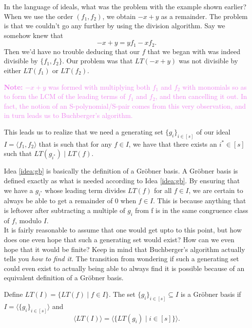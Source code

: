 \documentclass[10pt]{article}
\newcommand{\gb}{Gr\"{o}bner }
\newcommand*{\ideal}[1]{\langle#1\rangle}
\begin{document}
In the language of ideals, what was the problem with the example shown earlier? When we use the order $(f_1, f_2)$, we obtain $-x + y$ as a remainder. The problem is that we couldn't go any further by using the division algorithm. Say we somehow knew that
\[
-x + y = yf_1 - xf_2.
\]
Then we'd have no trouble deducing that our $f$ that we began with was indeed divisible by $\{f_1, f_2\}$. Our problem was that $LT(-x+y)$ was not divisible by either $LT(f_1)$ or $LT(f_2)$. 

\begin{mdframed}
\textcolor{Violet}{\textbf{Note:} $-x + y$ was formed with multiplying both $f_1$ and $f_2$ with monomials so as to form the LCM of the leading terms of $f_1$ and $f_2$, and then cancelling it out. In fact, the notion of an S-polynomial/S-pair comes from this very observation, and in turn leads us to Buchberger's algorithm.}
\end{mdframed}

\begin{ideabox}
\label{idea:gb}
This leads us to realize that we need a generating set $\{g_i\}_{i \in [s]}$ of our ideal $I = \ideal{f_1, f_2}$ that is such that for any $f \in I$, we have that there exists an $i^* \in [s]$ such that $LT(g_{i^*}) \mid LT(f)$.
\end{ideabox}

Idea \ref{idea:gb} is basically the definition of a \gb basis. A \gb basis is defined exactly as what is needed according to Idea \ref{idea:gb}. By ensuring that we have a $g_{i^*}$ whose leading term divides $LT(f)$ for all $f \in I$, we are certain to always be able to get a remainder of $0$ when $f \in I$. This is because anything that is leftover after subtracting a multiple of $g_i$ from f is in the same congruence class of $f$, modulo $I$. \\

It is fairly reasonable to assume that one would get upto to this point, but how does one even hope that such a generating set would exist? How can we even hope that it would be finite? Keep in mind that Buchberger's algorithm actually tells you \emph{how to find it.} The transition from wondering if such a generating set could even exist to actually being able to always find it is possible because of an equivalent definition of a \gb basis.

\begin{definition}
\label{def:gb-as-ideals}
Define $LT(I) = \{LT(f) \mid f \in I\}$. The set $\{g_i\}_{i \in [s]} \subseteq I$ is a \gb basis if $I = \ideal{\{g_i\}_{i \in [s]}}$ and
\[
\ideal{LT(I)} = \ideal{\{LT(g_i) \mid i \in [s]\}}.
\]
\end{definition}
\end{document}
